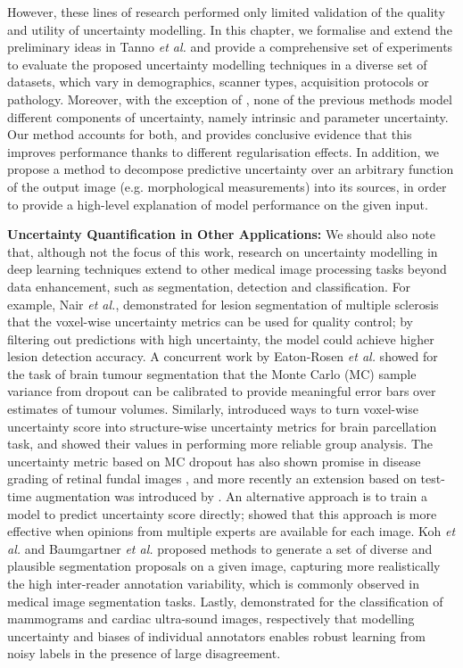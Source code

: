 However, these lines of research performed only limited validation of the quality and utility of uncertainty modelling. In this chapter, we formalise and extend the preliminary ideas in Tanno \emph{et al.} \cite{tanno2017bayesian} and provide a comprehensive set of experiments to evaluate the proposed uncertainty modelling techniques in a diverse set of datasets, which vary in demographics, scanner types, acquisition protocols or pathology. Moreover, with the exception of \cite{tanno2017bayesian}, none of the previous methods model different components of uncertainty, namely intrinsic and parameter uncertainty. Our method accounts for both, and provides conclusive evidence that this improves performance thanks to different regularisation effects. In addition, we propose a method to decompose predictive uncertainty over an arbitrary function of the output image (e.g. morphological measurements) into its sources, in order to provide a high-level explanation of model performance on the given input. 


\textbf{Uncertainty Quantification in Other Applications:}
We should also note that, although not the focus of this work, research on uncertainty modelling in deep learning techniques extend to other medical image processing tasks beyond data enhancement, such as segmentation, detection and classification. For example, Nair \emph{et al.}, \cite{nair2018exploring} demonstrated for lesion segmentation of multiple sclerosis that the voxel-wise uncertainty metrics can be used for quality control; by filtering out predictions with high uncertainty, the model could achieve higher lesion detection accuracy. A concurrent work by Eaton-Rosen \emph{et al.} \cite{eaton2018towards} showed for the task of brain tumour segmentation that the Monte Carlo (MC) sample variance from dropout \cite{gal2015dropout} can be calibrated to provide meaningful error bars over estimates of tumour volumes. Similarly,  \cite{roy2019bayesian} introduced ways to turn voxel-wise uncertainty score into structure-wise uncertainty metrics for brain parcellation task, and showed their values in performing more reliable group analysis. The uncertainty metric based on MC dropout has also shown promise in disease grading of retinal fundal images \cite{worrall2016automated,leibig2017leveraging}, and more recently an extension based on test-time augmentation was introduced by \cite{ayhan2018test}. An alternative approach is to train a model to predict uncertainty score directly; \cite{Raghu2018DirectUP} showed that this approach is more effective when opinions from multiple experts are available for each image. Koh \emph{et al.} \cite{kohl2018probabilistic} and Baumgartner \emph{et al.} \cite{PHiSeg2019Baumgartner} proposed methods to generate a set of diverse and plausible segmentation proposals on a given image, capturing more realistically the high inter-reader annotation variability, which is commonly observed in medical image segmentation tasks. Lastly, \cite{raykar2010learning,tanno2019learning} demonstrated for the classification of mammograms and cardiac ultra-sound images, respectively that modelling uncertainty and biases of individual annotators enables robust learning from noisy labels in the presence of large disagreement. 


